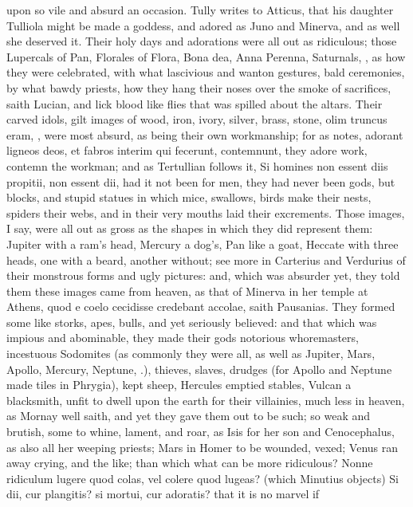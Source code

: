 {upon so vile and absurd an occasion. Tully writes to Atticus, that his
daughter Tulliola might be made a goddess, and adored as Juno and
Minerva, and as well she deserved it. Their holy days and adorations
were all out as ridiculous; those Lupercals of Pan, Florales of Flora,
Bona dea, Anna Perenna, Saturnals, \etc{}, as how they were celebrated,
with what lascivious and wanton gestures, bald ceremonies, by
what bawdy priests, how they hang their noses over the smoke of
sacrifices, saith Lucian, and lick blood like flies that was
spilled about the altars. Their carved idols, gilt images of wood,
iron, ivory, silver, brass, stone, olim truncus eram, \etc{}, were most
absurd, as being their own workmanship; for as \Seneca notes, adorant
ligneos deos, et fabros interim qui fecerunt, contemnunt, they adore
work, contemn the workman; and as Tertullian follows it, Si homines non
essent diis propitii, non essent dii, had it not been for men, they had
never been gods, but blocks, and stupid statues in which mice,
swallows, birds make their nests, spiders their webs, and in their very
mouths laid their excrements. Those images, I say, were all out as
gross as the shapes in which they did represent them: Jupiter with a
ram's head, Mercury a dog's, Pan like a goat, Heccate with three heads,
one with a beard, another without; see more in Carterius and
Verdurius of their monstrous forms and ugly pictures: and, which
was absurder yet, they told them these images came from heaven, as that
of Minerva in her temple at Athens, quod e coelo cecidisse credebant
accolae, saith Pausanias. They formed some like storks, apes, bulls,
and yet seriously believed: and that which was impious and abominable,
they made their gods notorious whoremasters, incestuous Sodomites (as
commonly they were all, as well as Jupiter, Mars, Apollo, Mercury,
Neptune, \etc{}.), thieves, slaves, drudges (for Apollo and Neptune made
tiles in Phrygia), kept sheep, Hercules emptied stables, Vulcan a
blacksmith, unfit to dwell upon the earth for their villainies, much
less in heaven, as Mornay well saith, and yet they gave them out
to be such; so weak and brutish, some to whine, lament, and roar, as
Isis for her son and Cenocephalus, as also all her weeping priests;
Mars in Homer to be wounded, vexed; Venus ran away crying, and the
like; than which what can be more ridiculous? Nonne ridiculum lugere
quod colas, vel colere quod lugeas? (which Minutius objects) Si
dii, cur plangitis? si mortui, cur adoratis? that it is no marvel if
}
